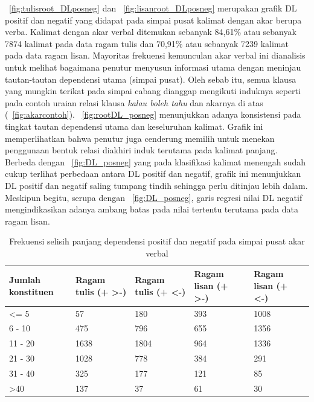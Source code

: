 \pic~\ref{fig:tulisroot_DLposneg} dan \pic~\ref{fig:lisanroot_DLposneg} merupakan grafik DL positif dan negatif yang didapat pada simpai pusat kalimat dengan akar berupa verba. Kalimat dengan akar verbal ditemukan sebanyak 84,61\% atau sebanyak 7874 kalimat pada data ragam tulis dan 70,91\% atau sebanyak 7239 kalimat pada data ragam lisan. Mayoritas frekuensi kemunculan akar verbal ini dianalisis untuk melihat bagaimana penutur menyusun informasi utama dengan meninjau tautan-tautan dependensi utama (simpai pusat). Oleh sebab itu, semua klausa yang mungkin terikat pada simpai cabang dianggap mengikuti induknya seperti pada contoh uraian relasi klausa \textit{kalau boleh tahu} dan akarnya di atas (\pic~\ref{fig:akarcontoh}). \pic~\ref{fig:rootDL_posneg} menunjukkan adanya konsistensi pada tingkat tautan dependensi utama dan keseluruhan kalimat. Grafik ini memperlihatkan bahwa penutur juga cenderung memilih untuk menekan penggunaan bentuk relasi diakhiri induk terutama pada kalimat panjang. Berbeda dengan \pic~\ref{fig:DL_posneg} yang pada klasifikasi kalimat menengah sudah cukup terlihat perbedaan antara DL positif dan negatif, grafik ini menunjukkan DL positif dan negatif saling tumpang tindih sehingga perlu ditinjau lebih dalam. Meskipun begitu, serupa dengan \pic~\ref{fig:DL_posneg}, garis regresi nilai DL negatif mengindikasikan adanya ambang batas pada nilai tertentu terutama pada data ragam lisan.

\begin{table}
\begin{center}
\begin{small}
\caption{Frekuensi selisih panjang dependensi positif dan negatif pada simpai pusat akar verbal}  \label{tab:DLpusatposneg}
\begin{tabular}{ | p{2cm} | p{2cm} | p{2cm} | p{2cm} | p{2cm} |}
    \hline
Jumlah konstituen & Ragam tulis (+ \textgreater -) & Ragam tulis (+ \textless -) & Ragam lisan (+ \textgreater -) & Ragam lisan (+ \textless -) \\ \hline
\textless= 5 	& 57	 	& 180 	& 393 & 1008 \\ \hline
6 - 10 		& 475 	& 796	& 655 & 1356 \\ \hline
11 - 20 		& 1638	& 1804	& 964 & 1336 \\ \hline
21 - 30 		& 1028	& 778	& 384 & 291 \\ \hline
31 - 40 		& 325	& 177	& 121 & 85 \\ \hline
\textgreater 40 	& 137	& 37	 	& 61 & 30 \\ \hline
   \end{tabular}
   \end{small}
\end{center}
\end{table}


